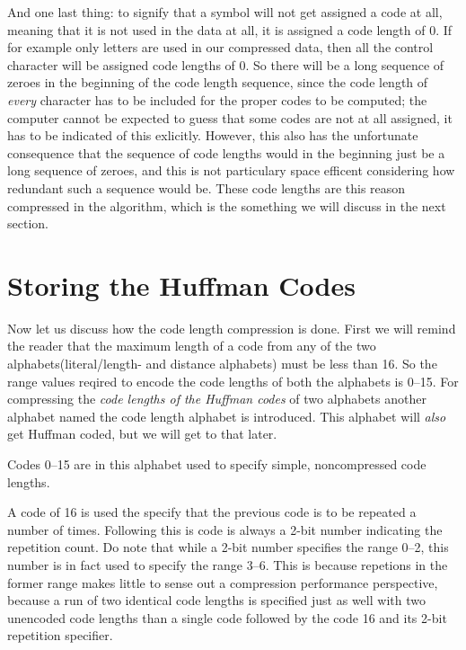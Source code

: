 And one last thing: to signify that a symbol will not get assigned a
code at all, meaning that it is not used in the data at all, it is
assigned a code length of $0$. If for example only \ascii letters are
used in our compressed data, then all the control character will be
assigned code lengths of $0$. So there will be a long sequence of
zeroes in the beginning of the code length sequence, since the code
length of \textit{every} character has to be included for the proper
codes to be computed; the computer cannot be expected to guess that
some codes are not at all assigned, it has to be indicated of this
exlicitly. However, this also has the unfortunate consequence that the
sequence of code lengths would in the beginning just be a long
sequence of zeroes, and this is not particulary space efficent
considering how redundant such a sequence would be. These code lengths
are this reason compressed in the  algorithm, which is the
something we will discuss in the next section.

\section{Storing the Huffman Codes}
\label{sec:storing-huffman-codes}

Now let us discuss how the code length compression is done. First we
will remind the reader that the maximum length of a code from any of
the two alphabets(literal/length- and distance alphabets) must be
less than 16. So the range values reqired to encode the code lengths
of both the alphabets is 0--15. For compressing the \textit{code
  lengths of the Huffman codes} of two alphabets another alphabet
named the code length alphabet is introduced. This alphabet will
\textit{also} get Huffman coded, but we will get to that later.

Codes 0--15 are in this alphabet used to specify simple,
noncompressed code lengths.

A code of 16 is used the specify that the previous code is to be
repeated a number of times. Following this is code is always a 2-bit
number indicating the repetition count. Do note that while a 2-bit
number specifies the range 0--2, this number is in fact used to specify
the range 3--6. This is because repetions in the former range makes
little to sense out a compression performance perspective, because a
run of two identical code lengths is specified just as well with two
unencoded code lengths than a single code followed by the code 16 and
its 2-bit repetition specifier.

